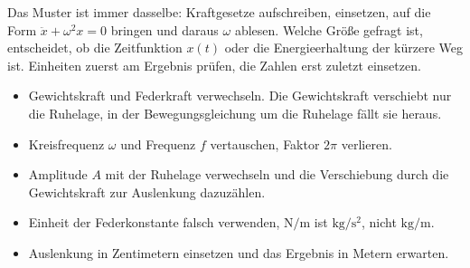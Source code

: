 \begin{werkzeugkasten}
Das Muster ist immer dasselbe: Kraftgesetze aufschreiben, einsetzen, auf die
Form $\ddot{x} + \omega^2 x = 0$ bringen und daraus $\omega$ ablesen. Welche
Größe gefragt ist, entscheidet, ob die Zeitfunktion $x(t)$ oder die
Energieerhaltung der kürzere Weg ist. Einheiten zuerst am Ergebnis prüfen, die
Zahlen erst zuletzt einsetzen.
\end{werkzeugkasten}

\begin{achtung}
\begin{itemize}
  \item Gewichtskraft und Federkraft verwechseln. Die Gewichtskraft verschiebt
        nur die Ruhelage, in der Bewegungsgleichung um die Ruhelage fällt sie
        heraus.
  \item Kreisfrequenz $\omega$ und Frequenz $f$ vertauschen, Faktor $2\pi$
        verlieren.
  \item Amplitude $A$ mit der Ruhelage verwechseln und die Verschiebung durch
        die Gewichtskraft zur Auslenkung dazuzählen.
  \item Einheit der Federkonstante falsch verwenden, $\si{\newton\per\metre}$
        ist $\si{\kilo\gram\per\second\squared}$, nicht $\si{\kilo\gram\per\metre}$.
  \item Auslenkung in Zentimetern einsetzen und das Ergebnis in Metern
        erwarten.
\end{itemize}
\end{achtung}

